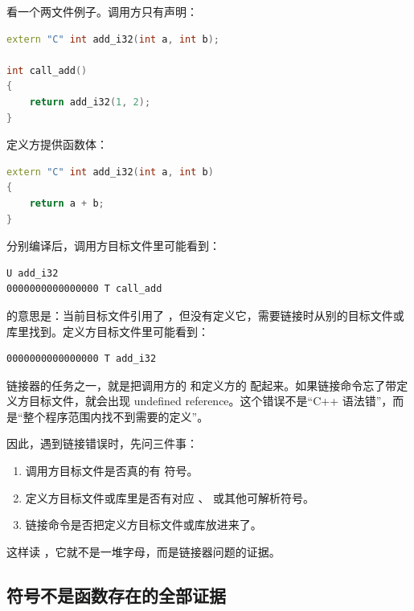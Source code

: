 看一个两文件例子。调用方只有声明：

\begin{lstlisting}[language=C++,caption={调用方只知道声明}]
extern "C" int add_i32(int a, int b);

int call_add()
{
    return add_i32(1, 2);
}
\end{lstlisting}

定义方提供函数体：

\begin{lstlisting}[language=C++,caption={定义方提供实体}]
extern "C" int add_i32(int a, int b)
{
    return a + b;
}
\end{lstlisting}

分别编译后，调用方目标文件里可能看到：

\begin{lstlisting}[numbers=none,caption={调用方目标文件中的未定义符号}]
                 U add_i32
0000000000000000 T call_add
\end{lstlisting}

 的意思是：当前目标文件引用了 ，但没有定义它，需要链接时从别的目标文件或库里找到。定义方目标文件里可能看到：

\begin{lstlisting}[numbers=none,caption={定义方目标文件中的 text 符号}]
0000000000000000 T add_i32
\end{lstlisting}

链接器的任务之一，就是把调用方的  和定义方的  配起来。如果链接命令忘了带定义方目标文件，就会出现 undefined reference。这个错误不是“C++ 语法错”，而是“整个程序范围内找不到需要的定义”。

因此，遇到链接错误时，先问三件事：

\begin{enumerate}
  \item 调用方目标文件是否真的有  符号。
  \item 定义方目标文件或库里是否有对应 、 或其他可解析符号。
  \item 链接命令是否把定义方目标文件或库放进来了。
\end{enumerate}

这样读 ，它就不是一堆字母，而是链接器问题的证据。

\subsection{符号不是函数存在的全部证据}

